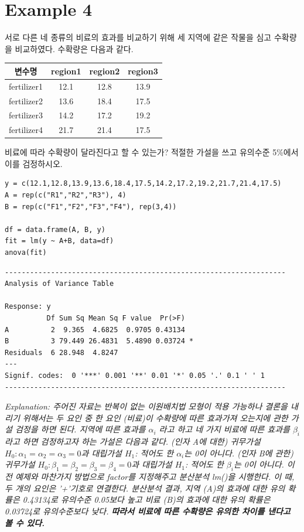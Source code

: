 \documentclass{article}
\begin{document}
\section*{Example 4}
서로 다른 네 종류의 비료의 효과를 비교하기 위해 세 지역에 같은 작물을 심고 수확량을
비교하였다. 수확량은 다음과 같다. 

\begin{table}[htb!]
\centering
\begin{tabularx}{0.5\textwidth}{@{\extracolsep{\fill}}|c|ccc|} \hline
변수명 & region1 & region2 & region3 \\ \hline
fertilizer1 & 12.1 & 12.8 & 13.9  \\ \hline
fertilizer2 & 13.6 & 18.4 & 17.5  \\ \hline
fertilizer3 & 14.2 & 17.2 & 19.2  \\ \hline
fertilizer4 & 21.7 & 21.4 & 17.5  \\ \hline

\end{tabularx}
\end{table}

비료에 따라 수확량이 달라진다고 할 수 있는가? 적절한 가설을 쓰고 유의수준 5\%에서 이를 검정하시오.

\begin{lstlisting}[style={r-style}]
y = c(12.1,12.8,13.9,13.6,18.4,17.5,14.2,17.2,19.2,21.7,21.4,17.5)
A = rep(c("R1","R2","R3"), 4)
B = rep(c("F1","F2","F3","F4"), rep(3,4))

df = data.frame(A, B, y)
fit = lm(y ~ A+B, data=df)
anova(fit)
\end{lstlisting}
\begin{lstlisting}[style={out-style}]
-------------------------------------------------------------------    
Analysis of Variance Table

Response: y
          Df Sum Sq Mean Sq F value  Pr(>F)  
A          2  9.365  4.6825  0.9705 0.43134  
B          3 79.449 26.4831  5.4890 0.03724 *
Residuals  6 28.948  4.8247 
---
Signif. codes:  0 '***' 0.001 '**' 0.01 '*' 0.05 '.' 0.1 ' ' 1
-------------------------------------------------------------------
\end{lstlisting}
\emph{Explanation: 주어진 자료는 반복이 없는 이원배치법 모형이 적용 가능하나 결론을 내리기 위해서는 두 요인 중 한 요인 (비료)이 수확량에 따른 효과가져 오는지에 관한 가설 검정을 하면 된다. 지역에 따른 효과를 $\alpha_i$
라고 하고 네 가지 비료에 따른 효과를 $\beta_i$ 라고 하면 검정하고자 하는 가설은 다음과 같다. (인자 A에 대한) 귀무가설 $H_0: \alpha_1=\alpha_2=\alpha_3=0$과 대립가설 $H_1$: 적어도 한 $\alpha_i$는 0이 아니다. (인자 B에 관한) 귀무가설 $H_0: \beta_1=\beta_2=\beta_3=\beta_4=0$과 대립가설 $H_1$: 적어도 한 $\beta_i$는 0이 아니다. 
이전 예제와 마찬가지 방법으로 factor를 지정해주고 분산분석 lm()을 시행한다. 이 때, 두 개의 요인은 '+'기호로 연결한다. 분산분석 결과, 지역 (A)의 효과에 대한 유의 확률은 0.43134로 유의수준 0.05보다 높고 비료 (B)의
효과에 대한 유의 확률은 0.03724로 유의수준보다 낮다. \textbf{따라서 비료에 따른 수확량은 유의한 차이를 낸다고 볼 수 있다.}} \\
\end{document}
